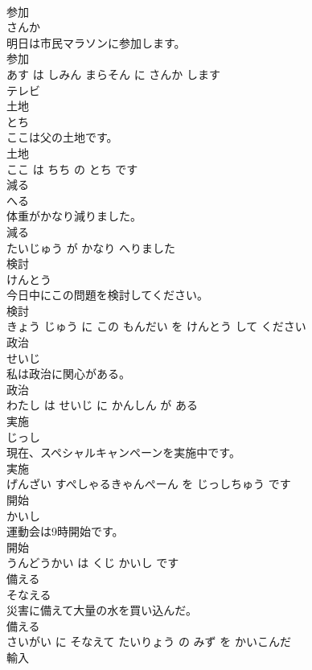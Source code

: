 \documentclass[8pt]{extreport}
\begin{document}
\begin{CJK}{UTF8}{min}
\\	参加	
\\	さんか			
\\	明日は市民マラソンに参加します。	
\\	参加 
\\	あす は しみん まらそん に さんか します			
\\	テレビ	
\\	土地	
\\	とち			
\\	ここは父の土地です。	
\\	土地 
\\	ここ は ちち の とち です			
\\	減る	
\\	へる			
\\	体重がかなり減りました。	
\\	減る 
\\	たいじゅう が かなり へりました			
\\	検討	
\\	けんとう			
\\	今日中にこの問題を検討してください。	
\\	検討 
\\	きょう じゅう に この もんだい を けんとう して ください			
\\	政治	
\\	せいじ			
\\	私は政治に関心がある。	
\\	政治 
\\	わたし は せいじ に かんしん が ある			
\\	実施	
\\	じっし			
\\	現在、スペシャルキャンペーンを実施中です。	
\\	実施 
\\	げんざい すぺしゃるきゃんぺーん を じっしちゅう です			
\\	開始	
\\	かいし			
\\	運動会は9時開始です。	
\\	開始 
\\	うんどうかい は くじ かいし です			
\\	備える	
\\	そなえる			
\\	災害に備えて大量の水を買い込んだ。	
\\	備える 
\\	さいがい に そなえて たいりょう の みず を かいこんだ			
\\	輸入	

\end{CJK}
\end{document}
